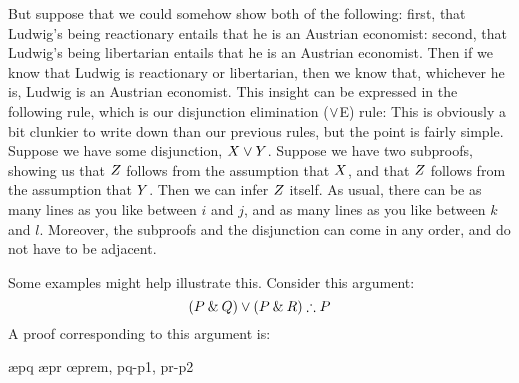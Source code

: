 But suppose that we could somehow show both of the following: first, that Ludwig's being reactionary entails that he is an Austrian economist: second, that Ludwig's being libertarian entails that he is an Austrian economist. Then if we know that Ludwig is reactionary or libertarian, then we know that, whichever he is, Ludwig is an Austrian economist. This insight can be expressed in the following rule, which is our disjunction elimination ($\vee$E) rule:
This is obviously a bit clunkier to write down than our previous rules, but the point is fairly simple. Suppose we have some disjunction, $X \vee Y$. Suppose we have two 
subproofs, 
showing us that $Z$ follows from 
the assumption that 
$X$, and that $Z$ follows from 
the assumption that 
$Y$. Then we can infer $Z$ itself. As usual, there can be as many lines as you like between
$i$ and $j$, and as many lines as you like between $k$ and $l$. 
Moreover, 
the subproofs and the disjunction 
can come in any order, and do not have to be adjacent.

Some examples might help illustrate this. Consider this argument:
$$(P \eand Q) \eor (P \eand R) \therefore P$$
A proof corresponding to this argument is:
	\begin{pf}
			\open
				\ae{pq}
			\close
			\open
				\ae{pr}
			\close
		\oe{prem, pq-p1, pr-p2}
	\end{pf}
	
	
	
